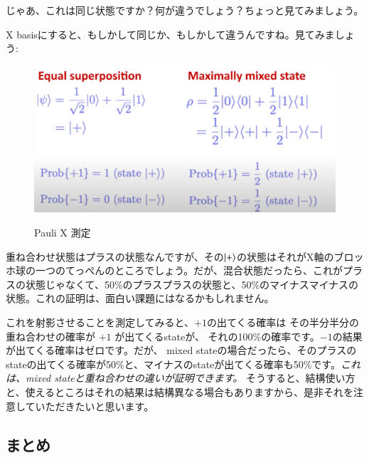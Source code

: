 じゃあ、これは同じ状態ですか？何が違うでしょう？ちょっと見てみましょう。

X basisにすると、もしかして同じか、もしかして違うんですね。見てみましょう:
\begin{figure}[H]
    \centering
    \includegraphics[width=1.0\textwidth]{lesson3/Pauli_X_measurement.pdf}
    \label{fig: 1}
    \begin{center}
        \caption{Pauli X 測定}
    \end{center}
\end{figure}

重ね合わせ状態はプラスの状態なんですが、その$\ket{+}$の状態はそれがX軸のブロッホ球の一つのてっぺんのところでしょう。だが、混合状態だったら、これがプラスの状態じゃなくて、50\%のプラスプラスの状態と、50\%のマイナスマイナスの状態。これの証明は、面白い課題にはなるかもしれません。

これを射影させることを測定してみると、$+1$の出てくる確率は
その半分半分の重ね合わせの確率が $+1$ が出てくるstateが、
それの100\%の確率です。$-1$の結果が出てくる確率はゼロです。だが、
mixed stateの場合だったら、そのプラスのstateの出てくる確率が50\%と、マイナスのstateが出てくる確率も50\%です。\textit{これは、mixed stateと重ね合わせの違いが証明できます。}
そうすると、結構使い方と、使えるところはそれの結果は結構異なる場合もありますから、是非それを注意していただきたいと思います。
\subsection{まとめ}


